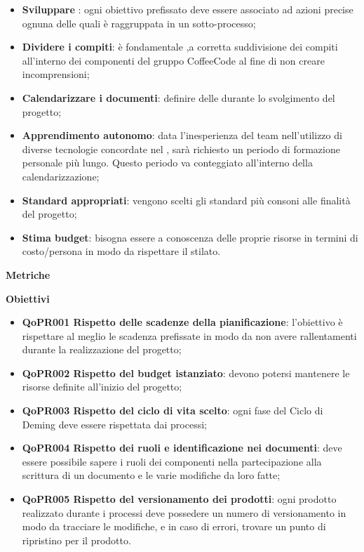 \documentclass[../paino-di-qualifica.tex]{subfiles}
\begin{document}
\begin{itemize}
    \item \textbf{Sviluppare }: ogni obiettivo prefissato deve essere associato ad azioni precise ognuna delle quali è raggruppata in un sotto-processo;
    \item \textbf{Dividere i compiti}: è fondamentale ,a corretta suddivisione dei compiti all'interno dei componenti del gruppo CoffeeCode al fine di non creare incomprensioni;
    \item \textbf{Calendarizzare i documenti}: definire delle  durante lo svolgimento del progetto;
    \item \textbf{Apprendimento autonomo}: data l'inesperienza del team nell'utilizzo di diverse tecnologie concordate nel , sarà richiesto un periodo di formazione personale più lungo. Questo periodo va conteggiato all'interno della calendarizzazione;
    \item \textbf{Standard appropriati}: vengono scelti gli standard più consoni alle finalità del progetto;
    \item \textbf{Stima budget}: bisogna essere a conoscenza delle proprie risorse in termini di costo/persona in modo da rispettare il  stilato.
\end{itemize}

\textbf{Metriche}

\textbf{Obiettivi}
\begin{itemize}
    \item \textbf{QoPR001 Rispetto delle scadenze della pianificazione}: l'obiettivo è rispettare al meglio le scadenza prefissate in modo da non avere rallentamenti durante la realizzazione del progetto;
    \item \textbf{QoPR002 Rispetto del budget istanziato}: devono potersi mantenere le risorse definite all'inizio del progetto;
    \item \textbf{QoPR003 Rispetto del ciclo di vita scelto}: ogni fase del Ciclo di Deming deve essere rispettata dai processi;
    \item \textbf{QoPR004 Rispetto dei ruoli e identificazione nei documenti}: deve essere possibile sapere i ruoli dei componenti nella partecipazione alla scrittura di un documento e le varie modifiche da loro fatte;
    \item \textbf{QoPR005 Rispetto del versionamento dei prodotti}: ogni prodotto realizzato durante i processi deve possedere un numero di versionamento in modo da tracciare le modifiche, e in caso di errori, trovare un punto di ripristino per il prodotto.
\end{itemize}
\end{document}
